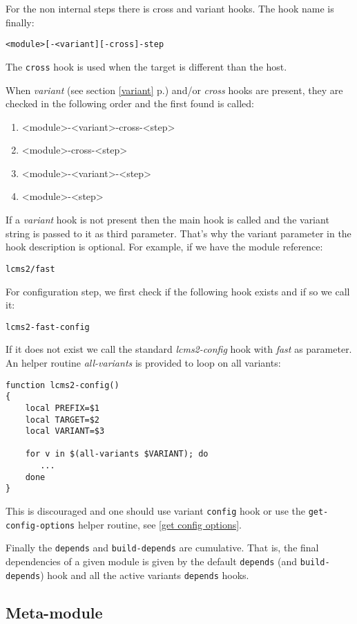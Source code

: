 \documentclass[a4paper,12pt,twoside]{article}
\newcommand{\code}[1]{\texttt{#1}}
\renewcommand{\emph}[1]{\textit{#1}}
\newcommand{\seeref}[1]{see section \ref{#1} p.\pageref{#1}}
\begin{document}
For the non internal steps there is cross and variant hooks. The hook name is finally:

\code{<module>[-<variant][-cross]-step}

The \code{cross} hook is used when the target is different than the host.

When \emph{variant} (\seeref{variant}) and/or \emph{cross} hooks are present, they are checked in the following order and the first found is called:

\begin{enumerate}
	\item <module>-<variant>-cross-<step>
	\item <module>-cross-<step>
	\item <module>-<variant>-<step>
	\item <module>-<step>
\end{enumerate}

If a \emph{variant} hook is not present then the main hook is called and the variant string is passed to it as third parameter. That's why the variant parameter in the hook description is optional.
For example, if we have the module reference:

\code{lcms2/fast}

For configuration step, we first check if the following hook exists and if so we call it:

\code{lcms2-fast-config}

If it does not exist we call the standard \emph{lcms2-config} hook with \emph{fast} as parameter. An helper routine \emph{all-variants} is provided to loop on all variants:

\begin{lstlisting}
function lcms2-config()
{
	local PREFIX=$1
	local TARGET=$2
	local VARIANT=$3

	for v in $(all-variants $VARIANT); do
	   ...
	done
}
\end{lstlisting}

This is discouraged and one should use variant \code{config} hook or use the \code{get-config-options} helper routine, see \ref{get config options}.

Finally the \code{depends} and \code{build-depends} are cumulative. That is, the final dependencies of a given module is given by the default \code{depends} (and \code{build-depends}) hook and all the active variants \code{depends} hooks.

\subsection{Meta-module}
\label{meta-module}
\end{document}
